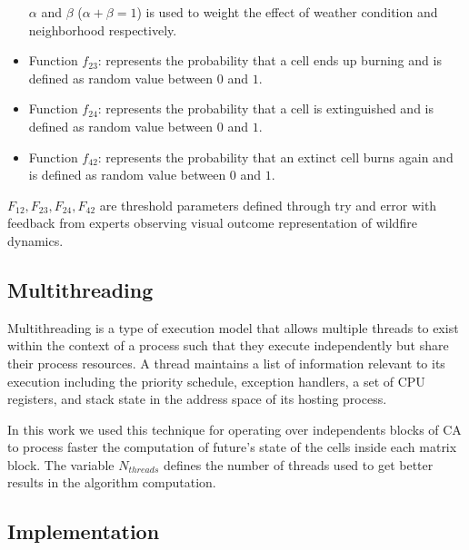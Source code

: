 \documentclass[conference]{IEEEtran}
\begin{document}
\begin{itemize}
                            $\alpha$ and $\beta$ ($\alpha+\beta = 1$) is used to weight the effect of weather condition 
                            and neighborhood respectively.
                    
                \item Function $f_{23}$: represents the probability that a cell ends up burning and is defined as random value between $0$ and $1$.
                \item Function $f_{24}$: represents the probability that a cell is extinguished and is defined as random value between $0$ and $1$.
                \item Function $f_{42}$: represents the probability that an extinct cell burns again and is defined as random value between $0$ and $1$.
            \end{itemize}
            
            $F_{12}, F_{23}, F_{24}, F_{42}$ are threshold parameters defined through try and error with feedback from experts observing visual 
            outcome representation of wildfire dynamics.
            
    \subsection{Multithreading}
    
        Multithreading is a type of execution model that allows multiple threads to exist within the context of a process 
        such that they execute independently but share their process resources. A thread maintains a list of information 
        relevant to its execution including the priority schedule, exception handlers, a set of CPU registers, and stack 
        state in the address space of its hosting process.
        
        In this work we used this technique for operating over independents blocks of CA to process faster the computation
        of future's state of the cells inside each matrix block. The variable $N_{threads}$ defines the number of threads
        used to get better results in the algorithm computation.
    
        
    \subsection{Implementation}
    
\end{document}

